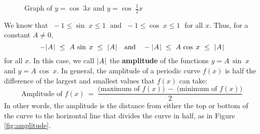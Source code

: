 \begin{exmp}
\begin{figure}[ht]
\begin{center}
\vspace{-6mm}
 \end{center}
 \caption[]{\quad Graph of $y=\cos\;3x$ and $y=\cos\;\frac{1}{2}x$}
 \label{fig:cosine3x}
\end{figure}
\end{exmp}
\divider
\vspace{1mm}

We know that $\;-1 \le \sin\;x \le 1\;$ and $\;-1 \le \cos\;x \le 1\;$ for all $x$. Thus, for a
constant $A \ne 0$,
\begin{displaymath}
 -\lvert\mspace{1mu}A\mspace{1mu}\rvert ~\le~ A\,\sin\;x ~\le~ \lvert\mspace{1mu}A\mspace{1mu}\rvert \quad\text{and}\quad
 -\lvert\mspace{1mu}A\mspace{1mu}\rvert ~\le~ A\,\cos\;x ~\le~ \lvert\mspace{1mu}A\mspace{1mu}\rvert
\end{displaymath}
for all $x$. In this case, we call $\lvert\mspace{1mu}A\mspace{1mu}\rvert$ the \textbf{amplitude} of the
functions $y=A\,\sin\;x$ and $y=A\,\cos\;x$. In general, the amplitude of a periodic curve $f(x)$
is half the difference of the largest and smallest values that $f(x)$ can take:
\begin{displaymath}
 \text{Amplitude of $f(x)$} ~=~ \frac{\text{(maximum of $f(x)$)} ~-~ \text{(minimum of $f(x)$)}}{2}
\end{displaymath}
In other words, the amplitude is the distance from either the top or bottom of the curve to the
horizontal line that divides the curve in half, as in Figure \ref{fig:amplitude}.

